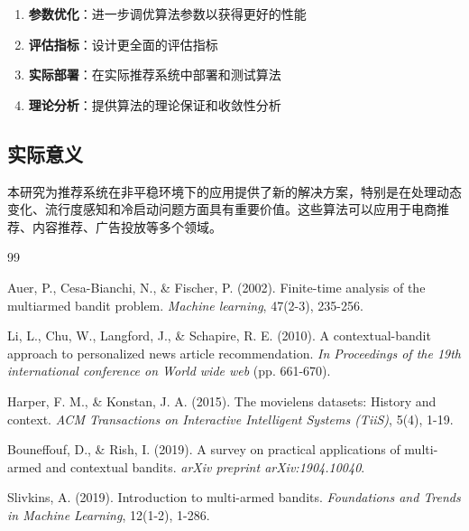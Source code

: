 \documentclass[12pt,a4paper]{article}
\begin{document}
\begin{enumerate}
    \item \textbf{参数优化}：进一步调优算法参数以获得更好的性能
    \item \textbf{评估指标}：设计更全面的评估指标
    \item \textbf{实际部署}：在实际推荐系统中部署和测试算法
    \item \textbf{理论分析}：提供算法的理论保证和收敛性分析
\end{enumerate}

\subsection{实际意义}

本研究为推荐系统在非平稳环境下的应用提供了新的解决方案，特别是在处理动态变化、流行度感知和冷启动问题方面具有重要价值。这些算法可以应用于电商推荐、内容推荐、广告投放等多个领域。

\begin{thebibliography}{99}

Auer, P., Cesa-Bianchi, N., \& Fischer, P. (2002). Finite-time analysis of the multiarmed bandit problem. \textit{Machine learning}, 47(2-3), 235-256.

Li, L., Chu, W., Langford, J., \& Schapire, R. E. (2010). A contextual-bandit approach to personalized news article recommendation. \textit{In Proceedings of the 19th international conference on World wide web} (pp. 661-670).

Harper, F. M., \& Konstan, J. A. (2015). The movielens datasets: History and context. \textit{ACM Transactions on Interactive Intelligent Systems (TiiS)}, 5(4), 1-19.

Bouneffouf, D., \& Rish, I. (2019). A survey on practical applications of multi-armed and contextual bandits. \textit{arXiv preprint arXiv:1904.10040}.

Slivkins, A. (2019). Introduction to multi-armed bandits. \textit{Foundations and Trends in Machine Learning}, 12(1-2), 1-286.

\end{thebibliography}
\end{document}
